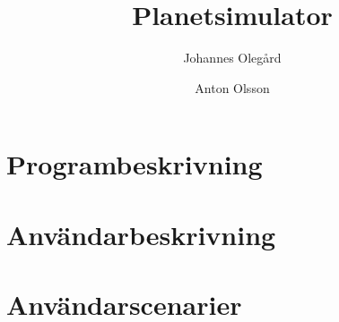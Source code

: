 \documentclass[a4paper, 11pt]{article}
\title{Planetsimulator}
\author{Johannes Olegård \and Anton Olsson}
\begin{document}
\maketitle

\section{Programbeskrivning}
\label{sec:progb}

\subsection{}


\subsection{}


\subsection{}


\section{Användarbeskrivning}
\label{sec:anvb}

\subsection{}


\subsection{}


\subsection{}


\section{Användarscenarier}
\label{sec:anvsc}

\subsection{}

\end{document}
